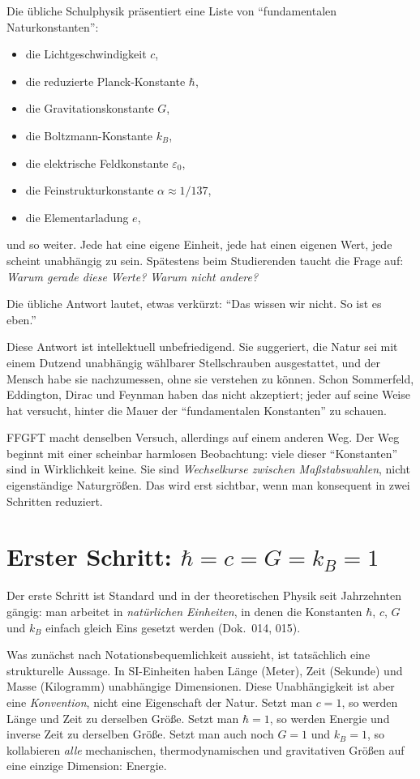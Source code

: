 Die übliche Schulphysik präsentiert eine Liste von ``fundamentalen
Naturkonstanten'':
\begin{itemize}\setlength\itemsep{0pt}
  \item die Lichtgeschwindigkeit $c$,
  \item die reduzierte Planck-Konstante $\hbar$,
  \item die Gravitationskonstante $G$,
  \item die Boltzmann-Konstante $k_B$,
  \item die elektrische Feldkonstante $\varepsilon_0$,
  \item die Feinstrukturkonstante $\alpha \approx 1/137$,
  \item die Elementarladung $e$,
\end{itemize}
und so weiter. Jede hat eine eigene Einheit, jede hat einen eigenen Wert,
jede scheint unabhängig zu sein. Spätestens beim Studierenden taucht die
Frage auf: \emph{Warum gerade diese Werte? Warum nicht andere?}

Die übliche Antwort lautet, etwas verkürzt: ``Das wissen wir nicht. So ist
es eben.''

Diese Antwort ist intellektuell unbefriedigend. Sie suggeriert, die
Natur sei mit einem Dutzend unabhängig wählbarer Stellschrauben ausgestattet,
und der Mensch habe sie nachzumessen, ohne sie verstehen zu können. Schon
Sommerfeld, Eddington, Dirac und Feynman haben das nicht akzeptiert; jeder
auf seine Weise hat versucht, hinter die Mauer der ``fundamentalen Konstanten''
zu schauen.

FFGFT macht denselben Versuch, allerdings auf einem anderen Weg. Der Weg
beginnt mit einer scheinbar harmlosen Beobachtung: viele dieser ``Konstanten''
sind in Wirklichkeit keine. Sie sind \emph{Wechselkurse zwischen
Maßstabswahlen}, nicht eigenständige Naturgrößen. Das wird erst sichtbar,
wenn man konsequent in zwei Schritten reduziert.

\section{Erster Schritt: $\hbar = c = G = k_B = 1$}

Der erste Schritt ist Standard und in der theoretischen Physik seit
Jahrzehnten gängig: man arbeitet in \emph{natürlichen Einheiten}, in
denen die Konstanten $\hbar$, $c$, $G$ und $k_B$ einfach gleich Eins
gesetzt werden (Dok.~014, 015).

Was zunächst nach Notationsbequemlichkeit aussieht, ist tatsächlich eine
strukturelle Aussage. In SI-Einheiten haben Länge (Meter), Zeit (Sekunde)
und Masse (Kilogramm) unabhängige Dimensionen. Diese Unabhängigkeit ist
aber eine \emph{Konvention}, nicht eine Eigenschaft der Natur. Setzt man
$c = 1$, so werden Länge und Zeit zu derselben Größe. Setzt man $\hbar = 1$,
so werden Energie und inverse Zeit zu derselben Größe. Setzt man auch noch
$G = 1$ und $k_B = 1$, so kollabieren \emph{alle} mechanischen,
thermodynamischen und gravitativen Größen auf eine einzige Dimension:
Energie.

